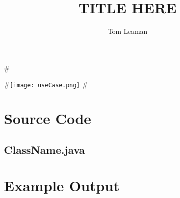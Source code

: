 \documentclass[titlepage, a4paper, twoside]{article}
\title{TITLE HERE}
\author{Tom Leaman}
\begin{document}
\maketitle

\section*{}

\subsection*{}
#\begin{center}
#\texttt{[image: useCase.png]}
#\end{center}

\newpage
\section*{Source Code}

\subsection*{ClassName.java}

\newpage

\section*{Example Output}
\end{document}
